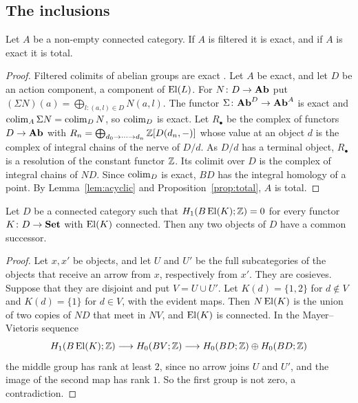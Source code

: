 \subsection{The inclusions}

\begin{proposition}\label{prop:incl}
Let $A$ be a non-empty connected category. If $A$ is filtered it is exact,
and if $A$ is exact it is total.
\end{proposition}

\begin{proof}
Filtered colimits of abelian groups are exact
\cite[Theorem~2.6.15]{Weibel}. Let $A$ be exact, and let $D$ be an action
component, a component of $\operatorname{El}(L)$. For $N\colon D\to\mathbf{Ab}$ put
$(\Sigma N)(a)=\bigoplus_{l:(a,l)\in D}N(a,l)$. The functor
$\Sigma\colon\mathbf{Ab}^D\to\mathbf{Ab}^A$ is exact and $\operatorname{colim}_A\Sigma N=\operatorname{colim}_DN$, so
$\operatorname{colim}_D$ is exact. Let $R_\bullet$ be the complex of functors $D\to\mathbf{Ab}$
with $R_n=\bigoplus_{d_0\to\dots\to d_n}\mathbb{Z}[D(d_n,-)]$ whose value at an object
$d$ is the complex of integral chains of the nerve of $D/d$. As $D/d$ has a
terminal object, $R_\bullet$ is a resolution of the constant functor $\mathbb{Z}$.
Its colimit over $D$ is the complex of integral chains of $ND$. Since
$\operatorname{colim}_D$ is exact, $BD$ has the integral homology of a point. By
Lemma~\ref{lem:acyclic} and Proposition~\ref{prop:total}, $A$ is total.
\end{proof}

\begin{lemma}\label{lem:succ}
Let $D$ be a connected category such that $H_1(B\operatorname{El}(K);\mathbb{Z})=0$ for every
functor $K\colon D\to\mathbf{Set}$ with $\operatorname{El}(K)$ connected. Then any two objects of
$D$ have a common successor.
\end{lemma}

\begin{proof}
Let $x,x'$ be objects, and let $U$ and $U'$ be the full subcategories of the
objects that receive an arrow from $x$, respectively from $x'$. They are
cosieves. Suppose that they are disjoint and put $V=U\cup U'$. Let
$K(d)=\{1,2\}$ for $d\notin V$ and $K(d)=\{1\}$ for $d\in V$, with the
evident maps. Then $N\operatorname{El}(K)$ is the union of two copies of $ND$ that meet in
$NV$, and $\operatorname{El}(K)$ is connected. In the Mayer--Vietoris sequence
\[
 H_1(B\operatorname{El}(K);\mathbb{Z})\longrightarrow H_0(BV;\mathbb{Z})\longrightarrow
 H_0(BD;\mathbb{Z})\oplus H_0(BD;\mathbb{Z})
\]
the middle group has rank at least $2$, since no arrow joins $U$ and $U'$,
and the image of the second map has rank $1$. So the first group is not
zero, a contradiction.
\end{proof}

